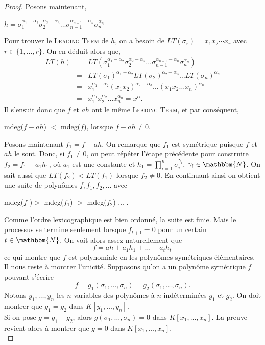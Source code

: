 \documentclass[12pt]{article}
\theoremstyle{remark}\newtheorem{note}{Note}
\theoremstyle{remark}\newtheorem{nota}{Notation}
\theoremstyle{definition}
\begin{document}
\begin{proof}
Posons maintenant,
\begin{center}
$h=\sigma_1^{\alpha_1 - \alpha_2} \sigma_2^{\alpha_2 - \alpha_3} \ldots \sigma_{n-1}^{\alpha_{n-1}-\alpha_n} \sigma_n^{\alpha_n}$
\end{center}
Pour trouver le \textsc{Leading Term} de $h$, on a besoin de $LT(\sigma_r)=x_1x_2 \cdots x_r$ avec $r \in \lbrace 1, \ldots , r \rbrace$. On en déduit alors que, 
\begin{eqnarray}
LT(h) &=& LT( \sigma_1^{\alpha_1 - \alpha_2} \sigma_2^{\alpha_2 - \alpha_3} \ldots \sigma_{n-1}^{\alpha_{n-1}-\alpha_n} \sigma_n^{\alpha_n}) \nonumber \\
&=& LT(\sigma_1)^{\alpha_1 - \alpha_2}LT(\sigma_2)^{\alpha_2 - \alpha_3} \ldots LT(\sigma_n)^{\alpha_n} \nonumber \\
&=& x_1^{\alpha_1 - \alpha_2}(x_1x_2)^{\alpha_2 - \alpha_3} \ldots (x_1x_2 \ldots x_n)^{\alpha_n} \nonumber \\ 
&=& x_1^{\alpha_1}x_2^{\alpha_2} \ldots x_n^{\alpha_n} = x^\alpha . \nonumber
\end{eqnarray}
Il s'ensuit donc que $f$ et $ah$ ont le même \textsc{Leading Term}, et par conséquent,
\begin{center}
mdeg($f-ah$) $<$ mdeg($f$), lorsque $f-ah \neq 0$.
\end{center}
\vspace{12pt}Posons maintenant $f_1 = f - ah$. On remarque que $f_1$ est symétrique puisque $f$ et $ah$ le sont. Donc, si $f_1 \neq 0$, on peut répéter l'étape précédente pour construire $f_2 = f_1 - a_1h_1$, où $a_1$ est une constante et $h_1 = \displaystyle \prod_{i=1}^{n} \sigma_i^{\gamma_i}$, $\gamma_i \in \mathbbm{N}$. On sait aussi que $LT(f_2)<LT(f_1)$ lorsque $f_2 \neq 0$. En continuant ainsi on obtient une suite de polynômes $f, f_1, f_2, \ldots$ avec
\begin{center}
mdeg($f$ )$>$ mdeg($f_1$) $>$ mdeg($f_2$) $\ldots$ .
\end{center}
Comme l'ordre lexicographique est bien ordonné, la suite est finie. Mais le processus se termine seulement lorsque $f_{t+1}=0$ pour un certain $t \in \mathbbm{N}$. On voit alors assez naturellement que 
$$f = ah + a_1h_1 + \ldots + a_th_t\,$$
ce qui montre que $f$ est polynomiale en les polynômes symétriques élémentaires.
\\

Il nous reste à montrer l'unicité. Supposons qu'on a un polynôme symétrique $f$ pouvant s'écrire
$$f=g_1(\sigma_1, \ldots , \sigma_n) = g_2(\sigma_1, \ldots , \sigma_n).$$
Notons $y_1, \ldots , y_n$ les $n$ variables des polynômes à $n$ indéterminées $g_1$ et $g_2$. On doit montrer que $g_1 = g_2$ dans $K \left[  y_1, \ldots , y_n \right] $.\\
Si on pose $g = g_1 - g_2$, alors $g(\sigma_1 , \ldots , \sigma_n) = 0$ dans $K \left[ x_1, \ldots , x_n \right] $. La preuve revient alors à montrer que $g=0$ dans $K \left[ x_1, \ldots , x_n \right]$.\\


\end{proof}
\end{document}
